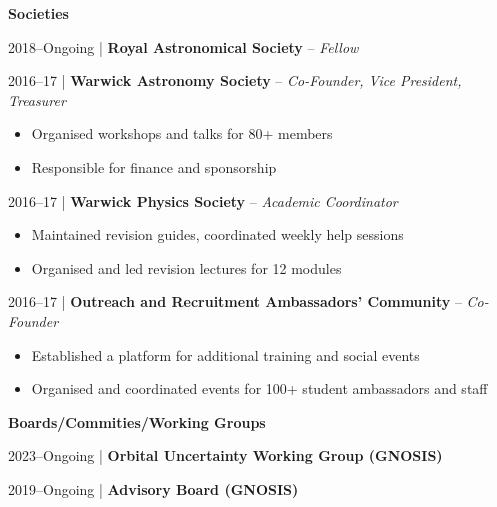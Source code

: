 \documentclass[10pt,a4paper]{altacv}
\begin{document}
\divider

\normalsize \textbf{Societies}

\medskip

\small 2018--Ongoing | \textbf{Royal Astronomical Society} -- \textit{Fellow} \\

\smallskip

\small 2016--17 | \textbf{Warwick Astronomy Society} -- \textit{Co-Founder, Vice President, Treasurer} \\
\smallskip
\begin{itemize}
	\item Organised workshops and talks for 80+ members
	\item Responsible for finance and sponsorship
\end{itemize}

\smallskip

\small 2016--17 | \textbf{Warwick Physics Society} -- \textit{Academic Coordinator} \\
\smallskip
\begin{itemize}
	\item Maintained revision guides, coordinated weekly help sessions
	\item Organised and led revision lectures for 12 modules
\end{itemize}

\smallskip

\small 2016--17 | \textbf{Outreach and Recruitment Ambassadors' Community} -- \textit{Co-Founder} \\
\smallskip
\begin{itemize}
	\item Established a platform for additional training and social events
	\item Organised and coordinated events for 100+ student ambassadors and staff
\end{itemize}

\divider

\normalsize \textbf{Boards/Commities/Working Groups}

\medskip

\small 2023--Ongoing | \textbf{Orbital Uncertainty Working Group (GNOSIS)} \\

\smallskip

\small 2019--Ongoing | \textbf{Advisory Board (GNOSIS)} \\

\smallskip
\end{document}
